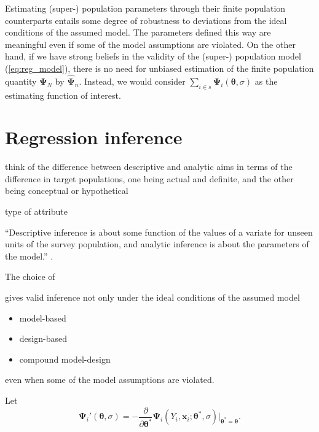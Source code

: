 \documentclass[a4paper,oneside,11pt,DIV=12]{scrartcl}
\theoremstyle{remark}
\begin{document}
Estimating (super-) population parameters through their finite population counterparts entails some degree of robustness to deviations from the ideal conditions of the assumed model. The parameters defined this way are meaningful even if some of the model assumptions are violated. On the other hand, if we have strong beliefs in the validity of the (super-) population model (\ref{eq:reg_model}), there is no need for unbiased estimation of the finite population quantity $\bm \Psi_N$ by $\widehat{\bm \Psi}_n$. Instead, we would consider $\sum_{i \in s} \bm \Psi_i(\bm \theta, \sigma)$ as the estimating function of interest.

\section{Regression inference}

think of the difference between descriptive and analytic aims in terms of the difference in target populations, one being actual and definite, and the other being conceptual or hypothetical

type of attribute

``Descriptive inference is about some function of the values of a variate for unseen units of the survey population, and analytic inference is about the parameters of the model.'' \citep[][p. 200]{thompson_1997}.

The choice of

\citet{thompson_1997}

 

gives valid inference not only under the ideal conditions of the assumed model

\begin{itemize}
    \item model-based
    \item design-based
    \item compound model-design
\end{itemize}


even when some of the model assumptions are violated.

Let
\begin{equation}
    \bm \Psi_i'(\bm \theta, \sigma) = -\frac{\partial}{\partial \bm \theta^*} \bm \Psi_i(Y_i, \bm x_i; \bm \theta^*, \sigma) \bigg\vert_{\bm \theta^* = \bm \theta}.
\end{equation}


\end{document}
